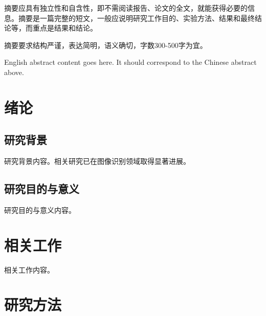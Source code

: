 \documentclass[
    degree=master-academic,
    StudentName=张三,
    StudentNameEng={San Zhang},
    StudentID=2021123456,
    AdvisorName=李四,
    AdvisorNameEng={Si Li},
    AdvisorNameEngSecond={Wu Wang},
    Major=计算机科学与技术,
    Department=计算机学院,
    DepartmentEng={College of Computer Science},
    ResearchInterest=人工智能,
    SubmitYear=2024,
    SubmitMonth=6,
    SubmitDay=1,
    DefenseYear=2024,
    DefenseMonth=6,
    DefenseDay=15,
    DefenseDateEng={June 15, 2024},
    CLCNumber=TP391,
    UDCNumber=004.9,
    Title=基于某某方法的某课题研究,
    TitleEng={Research on Some Topic Based on Some Method}
]{cauc_thesis}
\begin{document}
\frontmatter

\makecover

\begin{abstract-zh}
    摘要应具有独立性和自含性，即不需阅读报告、论文的全文，就能获得必要的信息。摘要是一篇完整的短文，一般应说明研究工作目的、实验方法、结果和最终结论等，而重点是结果和结论。

    摘要要求结构严谨，表达简明，语义确切，字数300-500字为宜。

\end{abstract-zh}

\begin{abstract-en}
    English abstract content goes here. It should correspond to the Chinese abstract above.

\end{abstract-en}

\makefrontmatter
\printnomenclature

\mainmatter

\chapter{绪论}


\section{研究背景}

研究背景内容。相关研究已在图像识别领域取得显著进展。

\section{研究目的与意义}

研究目的与意义内容。

\chapter{相关工作}

相关工作内容。

\chapter{研究方法}
\end{document}
